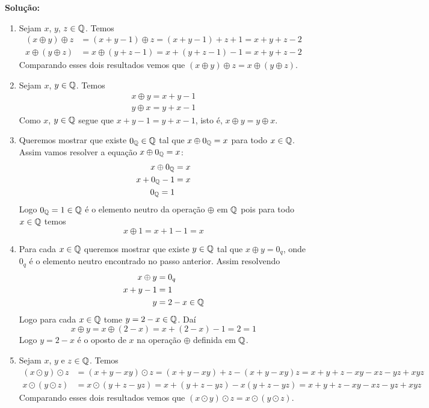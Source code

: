 \documentclass[12pt]{article}
\begin{document}
\noindent\textbf{Solu\c{c}\~ao:}
\begin{enumerate}
	\item Sejam $x$, $y$, $z \in \mathbb{Q}$. Temos
	\begin{align*}
		(x \oplus y) \oplus z &= (x + y - 1) \oplus z = (x + y - 1) + z + 1 = x + y + z - 2\\
		x \oplus (y \oplus z) &= x \oplus (y + z - 1) = x + (y + z - 1) - 1 = x + y + z - 2
	\end{align*}
	Comparando esses dois resultados vemos que $(x \oplus y) \oplus z = x \oplus (y \oplus z)$.

	\item Sejam $x$, $y \in \mathbb{Q}$. Temos
	\begin{align*}
		x \oplus y = x + y - 1\\
		y \oplus x = y + x - 1
	\end{align*}
	Como $x$, $y \in \mathbb{Q}$ segue que $x + y - 1 = y + x - 1$, isto é, $x \oplus y = y \oplus x$.

	\item Queremos mostrar que existe $0_{\mathbb{Q}} \in \mathbb{Q}$ tal que $x \oplus 0_{\mathbb{Q}} = x$ para todo $x \in \mathbb{Q}$.
	Assim vamos resolver a equação $x \oplus 0_{\mathbb{Q}} = x$:
	\begin{align*}
		x\oplus 0_{\mathbb{Q}} &= x\\
		x + 0_{\mathbb{Q}} - 1 &= x\\
		0_{\mathbb{Q}} = 1
	\end{align*}
	Logo $0_{\mathbb{Q}} = 1 \in \mathbb{Q}$ é o elemento neutro da operação $\oplus$ em $\mathbb{Q}$ pois para todo $x \in \mathbb{Q}$ temos
	\[
		x \oplus 1 = x + 1 - 1 = x
	\]

	\item Para cada $x \in \mathbb{Q}$ queremos mostrar que existe $y \in \mathbb{Q}$ tal que $x \oplus y = 0_q$, onde $0_q$ é o elemento neutro encontrado no passo anterior. Assim resolvendo
	\begin{align*}
		x \oplus y &= 0_q\\
		x + y - 1 &= 1\\
		y &= 2 - x \in \mathbb{Q}
	\end{align*}
	Logo para cada $x \in \mathbb{Q}$ tome $y = 2 - x \in \mathbb{Q}$. Daí
	\[
		x \oplus y = x \oplus (2 - x) = x + (2 - x) - 1 = 2 = 1
	\]
	Logo $y = 2 - x$ é o oposto de $x$ na operação $\oplus$ definida em $\mathbb{Q}$.

	\item Sejam $x$, $y$ e $z \in \mathbb{Q}$. Temos
	\begin{align*}
		(x \odot y) \odot z &= (x + y - xy) \odot z = (x + y - xy) + z - (x + y - xy)z = x + y + z - xy - xz - yz + xyz\\
		x \odot (y \odot z) &= x \odot (y + z - yz) = x + (y + z - yz) - x(y + z - yz) = x + y + z - xy - xz - yz + xyz
	\end{align*}
	Comparando esses dois resultados vemos que $(x \odot y) \odot z = x \odot (y \odot z)$.


\end{enumerate}
\end{document}
